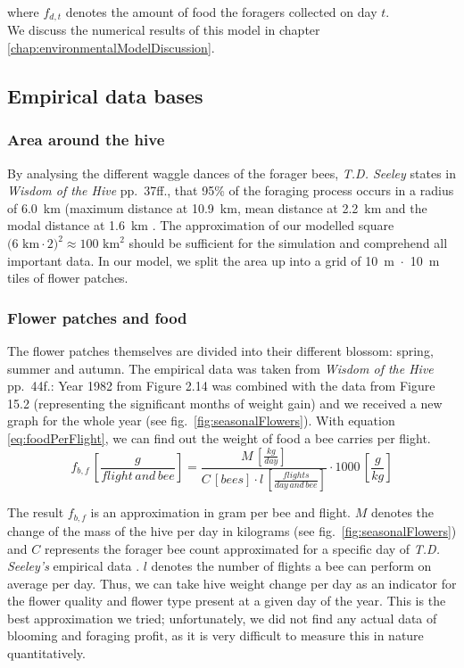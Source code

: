 			where $f_{d,t}$ denotes the amount of food the foragers collected on day $t$.\\
			
			We discuss the numerical results of this model in chapter \ref{chap:environmentalModelDiscussion}.
		
	\subsection{Empirical data bases}
		\label{chap:empiricalDataBases}
		\subsubsection{Area around the hive}
			\label{chap:areaAroundTheHive}
			By analysing the different waggle dances of the forager bees, \textit{T.D. Seeley} states in \textit{Wisdom of the Hive} pp.~37ff., that 95\% of the foraging process occurs in a radius of 6.0~km (maximum distance at 10.9~km, mean distance at 2.2~km and the modal distance at 1.6~km \cite{seeley95}. The approximation of our modelled square $\text{(6~km}\cdot\text{2)}^2 \approx \text{100~km}^2$ should be sufficient for the simulation and comprehend all important data. In our model, we split the area up into a grid of 10~m~$\cdot$~10~m tiles of flower patches.
			
		\subsubsection{Flower patches and food}
			\label{chap:flowerPatchesAndFood}
			The flower patches themselves are divided into their different blossom: spring, summer and autumn. The empirical data was taken from \textit{Wisdom of the Hive} pp.~44f.: Year 1982 from Figure 2.14 was combined with the data from Figure 15.2 (representing the significant months of weight gain) and we received a new graph for the whole year (see fig.~\ref{fig:seasonalFlowers}). With equation \ref{eq:foodPerFlight}, we can find out the weight of food a bee carries per flight.
			\begin{equation}\label{eq:foodPerFlight}
						f_{b,f} \,[\frac{g}{flight\, and\, bee}] = \frac{M \,[\frac{kg}{day}]}{C \,[bees] \cdot l \,[\frac{flights}{day \,and\, bee}]}\cdot 1000 \,[\frac{g}{kg}]
			\end{equation}
			
			The result $f_{b,f}$ is an approximation in gram per bee and flight. $M$ denotes the change of the mass of the hive per day in kilograms (see fig.~\ref{fig:seasonalFlowers}) and $C$ represents the forager bee count approximated for a specific day of \textit{T.D. Seeley's} empirical data \cite{seeley95}. $l$ denotes the number of flights a bee can perform on average per day. Thus, we can take hive weight change per day as an indicator for the flower quality and flower type present at a given day of the year. This is the best approximation we tried; unfortunately, we did not find any actual data of blooming and foraging profit, as it is very difficult to measure this in nature quantitatively.
			
